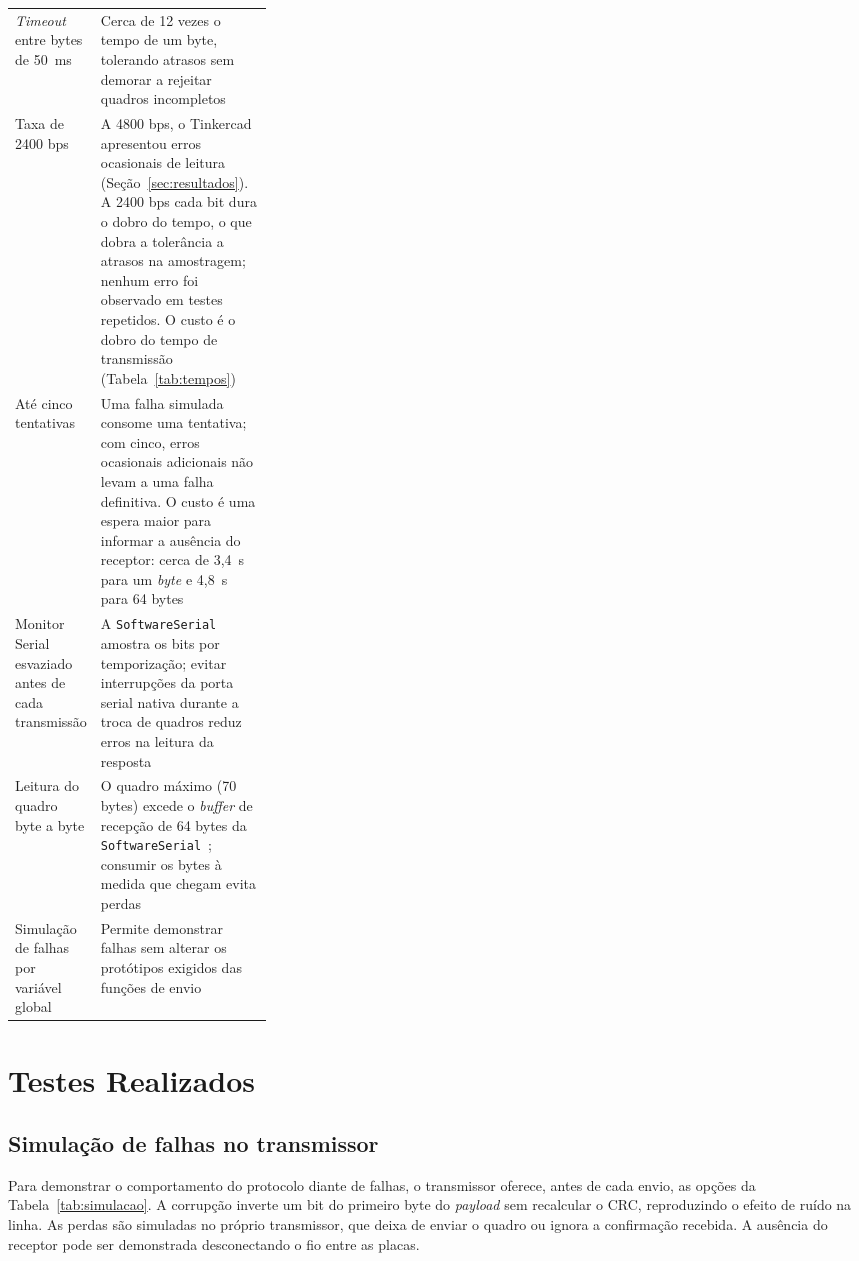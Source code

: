 \documentclass[12pt]{article}
\begin{document}
\begin{table}[!htb]
\begin{tabularx}{\linewidth}{>{\raggedright\arraybackslash}p{0.3\linewidth}L}
\emph{Timeout} entre bytes de 50~ms & Cerca de 12 vezes o tempo de um byte, tolerando atrasos sem demorar a rejeitar quadros incompletos \\
Taxa de 2400 bps & A 4800 bps, o Tinkercad apresentou erros ocasionais de leitura (Seção~\ref{sec:resultados}). A 2400 bps cada bit dura o dobro do tempo, o que dobra a tolerância a atrasos na amostragem; nenhum erro foi observado em testes repetidos. O custo é o dobro do tempo de transmissão (Tabela~\ref{tab:tempos}) \\
Até cinco tentativas & Uma falha simulada consome uma tentativa; com cinco, erros ocasionais adicionais não levam a uma falha definitiva. O custo é uma espera maior para informar a ausência do receptor: cerca de 3,4~s para um \emph{byte} e 4,8~s para 64 bytes \\
Monitor Serial esvaziado antes de cada transmissão & A \texttt{SoftwareSerial} amostra os bits por temporização; evitar interrupções da porta serial nativa durante a troca de quadros reduz erros na leitura da resposta \\
Leitura do quadro byte a byte & O quadro máximo (70 bytes) excede o \emph{buffer} de recepção de 64 bytes da \texttt{SoftwareSerial}~\cite{arduino-softwareserial}; consumir os bytes à medida que chegam evita perdas \\
Simulação de falhas por variável global & Permite demonstrar falhas sem alterar os protótipos exigidos das funções de envio \\
\bottomrule
\end{tabularx}
\end{table}

\section{Testes Realizados}
\label{sec:testes}

\subsection{Simulação de falhas no transmissor}

Para demonstrar o comportamento do protocolo diante de falhas, o transmissor oferece, antes de cada envio, as opções da Tabela~\ref{tab:simulacao}. A corrupção inverte um bit do primeiro byte do \emph{payload} sem recalcular o CRC, reproduzindo o efeito de ruído na linha. As perdas são simuladas no próprio transmissor, que deixa de enviar o quadro ou ignora a confirmação recebida. A ausência do receptor pode ser demonstrada desconectando o fio entre as placas.
\end{document}
